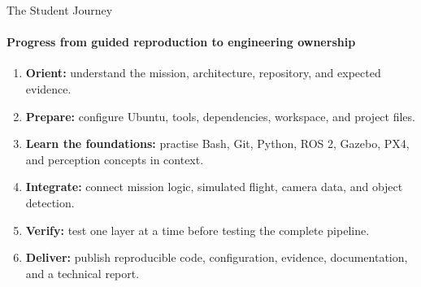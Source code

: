 \begin{frame}{The Student Journey}
    \framesubtitle{Progress from guided reproduction to engineering ownership}
    \footnotesize
    \begin{enumerate}
        \setlength{\itemsep}{0.35em}
        \item \textbf{Orient:} understand the mission, architecture, repository, and expected evidence.
        \item \textbf{Prepare:} configure Ubuntu, tools, dependencies, workspace, and project files.
        \item \textbf{Learn the foundations:} practise Bash, Git, Python, ROS 2, Gazebo, PX4, and perception concepts in context.
        \item \textbf{Integrate:} connect mission logic, simulated flight, camera data, and object detection.
        \item \textbf{Verify:} test one layer at a time before testing the complete pipeline.
        \item \textbf{Deliver:} publish reproducible code, configuration, evidence, documentation, and a technical report.
    \end{enumerate}
\end{frame}
















